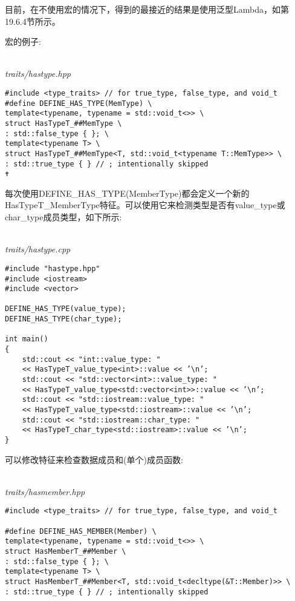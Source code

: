 目前，在不使用宏的情况下，得到的最接近的结果是使用泛型Lambda，如第19.6.4节所示。

宏的例子:

\hspace*{\fill} \\ %
\noindent
\textit{traits/hastype.hpp}
\begin{lstlisting}[style=styleCXX]
#include <type_traits> // for true_type, false_type, and void_t
#define DEFINE_HAS_TYPE(MemType) \
template<typename, typename = std::void_t<>> \
struct HasTypeT_##MemType \
: std::false_type { }; \
template<typename T> \
struct HasTypeT_##MemType<T, std::void_t<typename T::MemType>> \
: std::true_type { } // ; intentionally skipped
✝ 
\end{lstlisting}

每次使用DEFINE\_HAS\_TYPE(MemberType)都会定义一个新的HasTypeT\_MemberType特征。可以使用它来检测类型是否有value\_type或char\_type成员类型，如下所示:

\hspace*{\fill} \\ %
\noindent
\textit{traits/hastype.cpp}
\begin{lstlisting}[style=styleCXX]
#include "hastype.hpp"
#include <iostream>
#include <vector>

DEFINE_HAS_TYPE(value_type);
DEFINE_HAS_TYPE(char_type);

int main()
{
	std::cout << "int::value_type: "
	<< HasTypeT_value_type<int>::value << ’\n’;
	std::cout << "std::vector<int>::value_type: "
	<< HasTypeT_value_type<std::vector<int>>::value << ’\n’;
	std::cout << "std::iostream::value_type: "
	<< HasTypeT_value_type<std::iostream>::value << ’\n’;
	std::cout << "std::iostream::char_type: "
	<< HasTypeT_char_type<std::iostream>::value << ’\n’;
}
\end{lstlisting}

\subsubsubsection{19.6.3\hspace{0.2cm}检查非类型成员}

可以修改特征来检查数据成员和(单个)成员函数:

\hspace*{\fill} \\ %
\noindent
\textit{traits/hasmember.hpp}
\begin{lstlisting}[style=styleCXX]
#include <type_traits> // for true_type, false_type, and void_t

#define DEFINE_HAS_MEMBER(Member) \
template<typename, typename = std::void_t<>> \
struct HasMemberT_##Member \
: std::false_type { }; \
template<typename T> \
struct HasMemberT_##Member<T, std::void_t<decltype(&T::Member)>> \
: std::true_type { } // ; intentionally skipped
\end{lstlisting}


